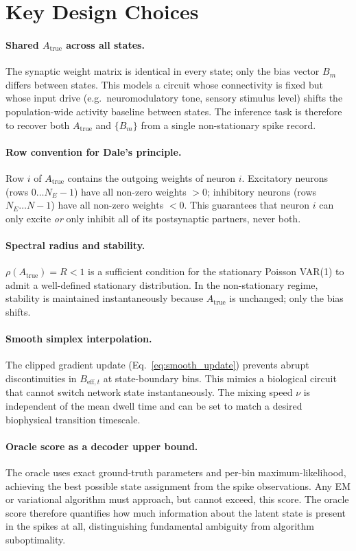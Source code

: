 \documentclass[11pt]{article}
\begin{document}
\section{Key Design Choices}
\label{sec:design}

\paragraph{Shared $A_{\text{true}}$ across all states.}
The synaptic weight matrix is identical in every state; only the
bias vector $B_m$ differs between states.
This models a circuit whose connectivity is fixed but whose
input drive (e.g.\ neuromodulatory tone, sensory stimulus level)
shifts the population-wide activity baseline between states.
The inference task is therefore to recover both $A_{\text{true}}$
and $\{B_m\}$ from a single non-stationary spike record.

\paragraph{Row convention for Dale's principle.}
Row $i$ of $A_{\text{true}}$ contains the outgoing weights of
neuron $i$.
Excitatory neurons (rows $0 \dots N_E - 1$) have all non-zero
weights $> 0$; inhibitory neurons (rows $N_E \dots N-1$) have
all non-zero weights $< 0$.
This guarantees that neuron $i$ can only excite \emph{or} only
inhibit all of its postsynaptic partners, never both.

\paragraph{Spectral radius and stability.}
$\rho(A_{\text{true}}) = R < 1$ is a sufficient condition for
the stationary Poisson VAR(1) to admit a well-defined stationary
distribution.
In the non-stationary regime, stability is maintained instantaneously
because $A_{\text{true}}$ is unchanged; only the bias shifts.

\paragraph{Smooth simplex interpolation.}
The clipped gradient update (Eq.~\eqref{eq:smooth_update}) prevents
abrupt discontinuities in $B_{\mathrm{eff},t}$ at state-boundary
bins.
This mimics a biological circuit that cannot switch network state
instantaneously.
The mixing speed $\nu$ is independent of the mean dwell time and
can be set to match a desired biophysical transition timescale.

\paragraph{Oracle score as a decoder upper bound.}
The oracle uses exact ground-truth parameters and per-bin
maximum-likelihood, achieving the best possible state assignment
from the spike observations.
Any EM or variational algorithm must approach, but cannot exceed,
this score.
The oracle score therefore quantifies how much information about
the latent state is present in the spikes at all, distinguishing
fundamental ambiguity from algorithm suboptimality.
\end{document}

